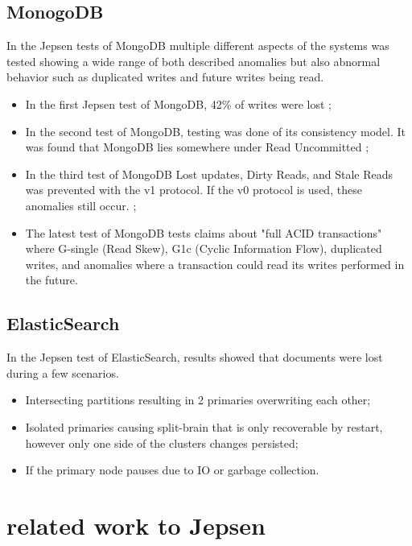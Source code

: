 \documentclass[a4paper,10pt,titlepage]{report}
\begin{document}
\subsection{MonogoDB}
In the Jepsen tests of MongoDB \cite{jepsenmongodb243, jepsenmongodb267, jepsenmongodb340} multiple different aspects of the systems was tested showing a wide range of both described anomalies but also abnormal behavior such as duplicated writes and future writes being read.
\begin{itemize}
\item In the first Jepsen test of MongoDB, 42\% of writes were lost \cite{jepsenmongodb243};
\item In the second test of MongoDB, testing was done of its consistency model. It was found that MongoDB lies somewhere under Read Uncommitted \cite{jepsenmongodb267};
\item In the third test of MongoDB Lost updates, Dirty Reads, and Stale Reads was prevented with the v1 protocol. If the v0 protocol is used, these anomalies still occur. \cite{jepsenmongodb340};
\item The latest test of MongoDB tests claims about "full ACID transactions" where G-single (Read Skew), G1c (Cyclic Information Flow), duplicated writes, and anomalies where a transaction could read its writes performed in the future. \cite{jepsenmongodb340}
\end{itemize}

\subsection{ElasticSearch}
In the Jepsen test of ElasticSearch, results showed that documents were lost during a few scenarios. \cite{aphyrelasticsearch}
\begin{itemize}
    \item Intersecting partitions resulting in 2 primaries overwriting each other;
    \item Isolated primaries causing split-brain that is only recoverable by restart, however only one side of the clusters changes persisted;
    \item If the primary node pauses due to IO or garbage collection.
\end{itemize}

\section{related work to Jepsen}
\end{document}
